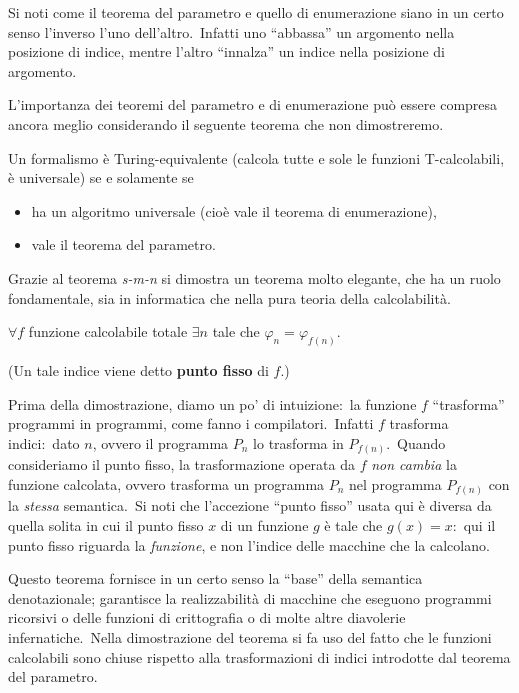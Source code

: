\noindent Si noti come il teorema del parametro e quello di enumerazione siano in un certo senso l'inverso l'uno dell'altro.\
Infatti uno ``abbassa'' un argomento nella posizione di indice, mentre l'altro ``innalza'' un indice nella posizione di argomento.

L'importanza dei teoremi del parametro e di enumerazione può essere compresa ancora meglio considerando il seguente teorema che non dimostreremo.\

\begin{theorem}[Espressività]
    Un formalismo è Turing-equivalente (calcola tutte e sole le funzioni T-calcolabili, è universale) se e solamente se
    \begin{itemize}
        \item ha un algoritmo universale (cioè vale il teorema di enumerazione),
        \item vale il teorema del parametro.
    \end{itemize}
\end{theorem}

\noindent Grazie al teorema \textit{s-m-n} si dimostra un teorema molto elegante, che ha un ruolo fondamentale, sia in informatica che nella pura teoria della calcolabilità.\

\begin{theorem}
    $\forall f$ funzione calcolabile totale $\exists n$ tale che $\varphi_n = \varphi_{f(n)}$.

    (Un tale indice viene detto \textbf{punto fisso} di $f$.)
\end{theorem}

\noindent Prima della dimostrazione, diamo un po' di intuizione:\ la funzione $f$ ``trasforma'' programmi in programmi, come fanno i compilatori.\
Infatti $f$ trasforma indici:\ dato $n$, ovvero il programma $P_n$ lo trasforma in $P_{f(n)}$.\
Quando consideriamo il punto fisso, la trasformazione operata da $f$ \textit{non cambia} la funzione calcolata, ovvero trasforma un programma $P_n$ nel programma $P_{f(n)}$ con la \textit{stessa} semantica.\
Si noti che l'accezione ``punto fisso'' usata qui è diversa da quella solita in cui il punto fisso $x$ di un funzione $g$ è tale che $g(x) = x$:\ qui il punto fisso riguarda la \textit{funzione}, e non l'indice delle macchine che la calcolano.\

Questo teorema fornisce in un certo senso la ``base'' della semantica denotazionale; garantisce la realizzabilità di macchine che eseguono programmi ricorsivi o delle funzioni di crittografia o di molte altre diavolerie infernatiche.\
Nella dimostrazione del teorema si fa uso del fatto che le funzioni calcolabili sono chiuse rispetto alla trasformazioni di indici introdotte dal teorema del parametro.\

